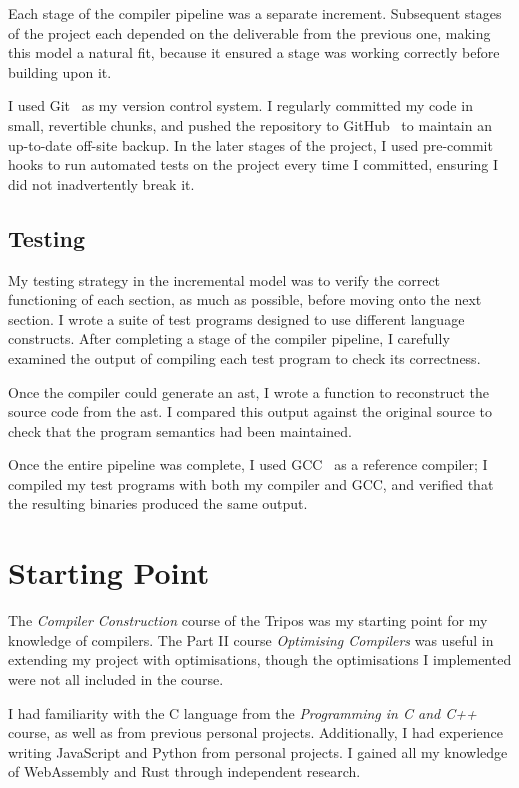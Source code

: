 \documentclass[00-main.tex]{subfiles}
\begin{document}
Each stage of the compiler pipeline was a separate increment.
Subsequent stages of the project each depended on the deliverable from the previous one, making this model a natural fit, because it ensured a stage was working correctly before building upon it.

I used Git~ as my version control system.
I regularly committed my code in small, revertible chunks, and pushed the repository to GitHub~ to maintain an up-to-date off-site backup.
In the later stages of the project, I used pre-commit hooks to run automated tests on the project every time I committed, ensuring I did not inadvertently break it.

\subsection{Testing}

My testing strategy in the incremental model was to verify the correct functioning of each section, as much as possible, before moving onto the next section.
I wrote a suite of test programs designed to use different language constructs.
After completing a stage of the compiler pipeline, I carefully examined the output of compiling each test program to check its correctness.

Once the compiler could generate an \gls{ast}, I wrote a function to reconstruct the source code from the \gls{ast}.
I compared this output against the original source to check that the program semantics had been maintained.

Once the entire pipeline was complete, I used GCC~ as a reference compiler; I compiled my test programs with both my compiler and GCC, and verified that the resulting binaries produced the same output.

\section{Starting Point}

The \emph{Compiler Construction} course of the Tripos was my starting point for my knowledge of compilers.
The Part II course \emph{Optimising Compilers} was useful in extending my project with optimisations, though the optimisations I implemented were not all included in the course.

I had familiarity with the C language from the \emph{Programming in C and C++} course, as well as from previous personal projects.
Additionally, I had experience writing JavaScript and Python from personal projects.
I gained all my knowledge of WebAssembly and Rust through independent research.
\end{document}
